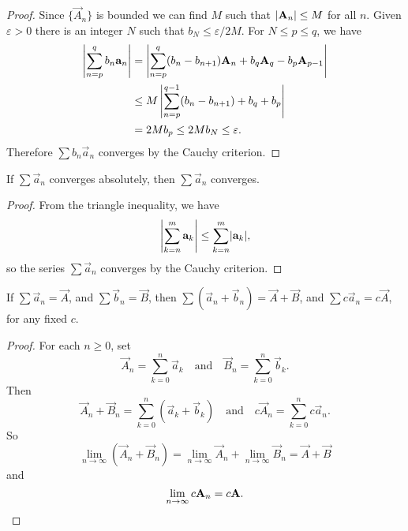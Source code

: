 \begin{proof}
  Since $\{\vec{A}_n\}$ is bounded we can find $M$ such that
  $\abs{\vec{A}_n}\leq M$ for all $n$. Given $\varepsilon>0$ there is
  an integer $N$ such that $b_N\leq\varepsilon/2M$. For
  $N\leq p\leq q$, we have
  \begin{align*}
    \Abs{\sum_{n=p}^qb_n\vec{a}_n}
    &= \Abs{\sum_{n=p}^q(b_n - b_{n+1})\vec{A}_n
      + b_q\vec{A}_q - b_p\vec{A}_{p-1}} \\
    &\leq M\Abs{\sum_{n=p}^{q-1}(b_n - b_{n+1}) + b_q + b_p} \\
    &= 2Mb_p\leq 2Mb_N\leq\varepsilon.
  \end{align*}
  Therefore $\sum b_n\vec{a}_n$ converges by the Cauchy criterion.
\end{proof}
\begin{thm}
  If $\sum\vec{a}_n$ converges absolutely, then $\sum\vec{a}_n$
  converges.
\end{thm}
\begin{proof}
  From the triangle inequality, we have
  \begin{equation*}
    \Abs{\sum_{k=n}^m\vec{a}_k}\leq\sum_{k=n}^m\abs{\vec{a}_k},
  \end{equation*}
  so the series $\sum\vec{a}_n$ converges by the Cauchy criterion.
\end{proof}
\begin{thm}
  If $\sum\vec{a}_n = \vec{A}$, and $\sum\vec{b}_n = \vec{B}$, then
  $\sum(\vec{a}_n+\vec{b}_n) = \vec{A} + \vec{B}$, and
  $\sum c\vec{a}_n = c\vec{A}$, for any fixed $c$.
\end{thm}
\begin{proof}
  For each $n\geq0$, set
  \begin{equation*}
    \vec{A}_n = \sum_{k=0}^n\vec{a}_k
    \quad\text{and}\quad
    \vec{B}_n = \sum_{k=0}^n\vec{b}_k.
  \end{equation*}
  Then
  \begin{equation*}
    \vec{A}_n + \vec{B}_n = \sum_{k=0}^n(\vec{a}_k + \vec{b}_k)
    \quad\text{and}\quad
    c\vec{A}_n = \sum_{k=0}^nc\vec{a}_n.
  \end{equation*}
  So
  \begin{equation*}
    \lim_{n\to\infty}(\vec{A}_n + \vec{B}_n)
    = \lim_{n\to\infty}\vec{A}_n
    + \lim_{n\to\infty}\vec{B}_n = \vec{A} + \vec{B}
  \end{equation*}
  and
  \begin{equation*}
    \lim_{n\to\infty}c\vec{A}_n = c\vec{A}. \qedhere
  \end{equation*}
\end{proof}
